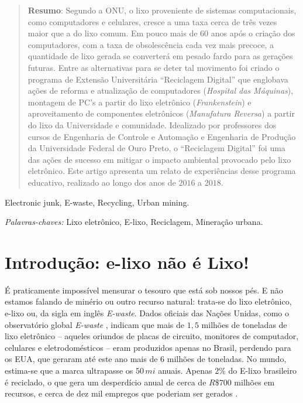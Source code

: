 \documentclass[a4paper]{ifacconf}
\begin{document}
\begin{frontmatter}
\begin{abstract}
\vskip 1mm%
{\noindent \bf Resumo}:  Segundo a ONU, o lixo proveniente de sistemas computacionais, como computadores e celulares, cresce a uma taxa cerca de três vezes maior que a do lixo comum. Em pouco mais de $60$ anos após o criação dos computadores, com a taxa de obsolescência cada vez mais precoce, a quantidade de lixo gerada se converterá em pesado fardo para as gerações futuras. Entre as alternativas para se deter tal movimento foi criado o programa de Extensão Universitária ``Reciclagem Digital'' que englobava ações de reforma e atualização de computadores (\emph{Hospital das Máquinas}), montagem de PC's a partir do lixo eletrônico (\emph{Frankenstein}) e aproveitamento de componentes eletrônicos (\emph{Manufatura Reversa}) a partir do lixo da Universidade e comunidade. Idealizado por professores dos cursos de Engenharia de Controle e Automação e Engenharia de Produção da Universidade Federal de Ouro Preto, o ``Reciclagem Digital'' foi uma das ações de sucesso em mitigar o impacto ambiental provocado pelo lixo eletrônico. Este artigo apresenta um relato de experiências desse programa educativo, realizado ao longo dos anos de $2016$ a $2018$.
\end{abstract}

\begin{keyword}
Electronic junk, E-waste, Recycling, Urban mining.

\vskip 1mm%
{\noindent\it Palavras-chaves:} Lixo eletrônico, E-lixo, Reciclagem, Mineração urbana.
\end{keyword}


\end{frontmatter}

\section{Introdução: e-lixo não é Lixo!}
É praticamente impossível mensurar o tesouro que está sob nossos pés. E não estamos falando de minério ou outro recurso natural: trata-se do lixo eletrônico, e-lixo ou, da sigla em inglês \textit{E-waste}. Dados oficiais das Nações Unidas, como o observatório global \textit{E-waste} \citep{e-waste}, indicam que mais de $1,5$ milhões de toneladas de lixo eletrônico -- aqueles oriundos de placas de circuito, monitores de computador, celulares e eletrodomésticos -- eram produzidos apenas no Brasil, perdendo para os EUA, que geraram até este ano mais de $6$ milhões de toneladas. No mundo, estima-se que a marca ultrapasse os $50\,mi$ anuais. Apenas $2\%$ do E-lixo brasileiro é reciclado, o que gera um desperdício anual de cerca de $R\$700$ milhões em recursos, e cerca de dez mil empregos que poderiam ser gerados \citep{Salviato}.
\end{document}
